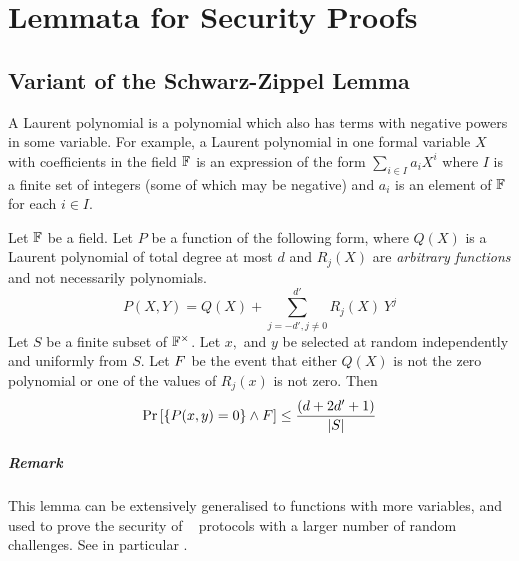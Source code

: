 \chapter{Lemmata for Security Proofs}
\label{chapterlabel:AlgIntProofs}

\section{Variant of the Schwarz-Zippel Lemma}

A Laurent polynomial is a polynomial which also has terms with negative powers in some variable. For example, a Laurent polynomial in one formal variable $X$ with coefficients in the field $\mathbb{F}$ is an expression of the form $\sum_{i \in I} a_i X^i$ where $I$ is a finite set of integers (some of which may be negative) and $a_i$ is an element of $\mathbb{F}$ for each $i \in I$.

\begin{lemma}
\label{lem:szvariant}
Let $\mathbb{F}$ be a field. Let $P$ be a function of the following form, where $Q(X)$ is a Laurent polynomial of total degree at most $d$ and $R_j(X)$ are \emph{arbitrary functions} and not necessarily polynomials.
\[
P(X,Y) = Q(X) + \sum_{j=-d', j \neq 0}^{d'} R_{j}(X) \ Y^{j}
\]
Let $S$ be a finite subset of $\mathbb{F}^\times$. Let $x,$ and $y$ be selected at random independently and uniformly from $S$. Let $F$ be the event that either $Q(X)$ is not the zero polynomial or one of the values of $R_j(x)$ is not zero. Then
\[
\Pr \left[ \lbrace P(x,y) = 0 \rbrace \wedge F \right] \leq \frac{(d+2d'+1)}{|S|}
\]
\end{lemma}
\paragraph{Remark} This lemma can be extensively generalised to functions with more variables, and used to prove the security of \ILC~ protocols with a larger number of random challenges. See in particular \cite{BootleCGGHJ17}.

